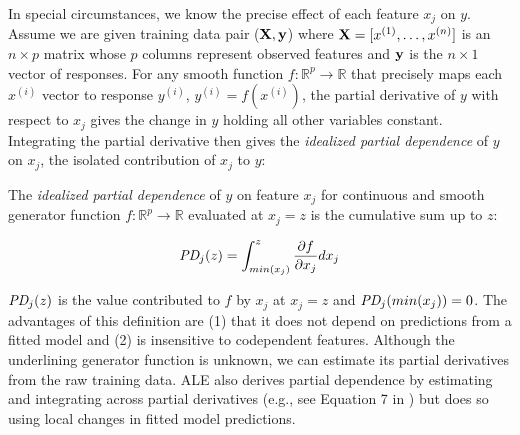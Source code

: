 \documentclass[]{article} %
\renewcommand{\xi}{x^{(i)}}
\begin{document}
In special circumstances, we know the precise effect of each feature $x_j$ on $y$.  Assume we are given training data pair ($\bf X, y$) where ${\bf X} = [x^{(1)}, \ldots, x^{(n)}]$ is an $n \times p$ matrix whose $p$ columns represent observed features and ${\bf y}$ is the $n \times 1$ vector of responses. For any smooth function $f:\mathbb{R}^{p} \rightarrow \mathbb{R}$ that precisely maps each $\xi$ vector to response $y^{(i)}$, ${y^{(i)}} = f(\xi)$, the partial derivative of $y$ with respect to $x_j$ gives the change in $y$ holding all other variables constant.  Integrating the partial derivative then gives the {\em idealized partial dependence}  of $y$ on $x_j$, the isolated contribution of $x_j$ to $y$:

 The {\em idealized partial dependence} of $y$ on feature $x_j$ for continuous and smooth generator function $f:\mathbb{R}^{p} \rightarrow \mathbb{R}$ evaluated at $x_j = z$ is the cumulative sum up to $z$:\vspace{-1mm}

\begin{equation}\label{eq:pd}
\text{\it PD}_j(z) = \int_{min(x_j)}^z \frac{\partial f}{\partial x_j} dx_j
\end{equation}\vspace{-1mm}

$\text{\it PD}_j(z)$ is the value contributed to $f$ by $x_j$ at $x_j = z$ and $\text{\it PD}_j(min(x_j))=0$. The advantages of this definition are (1) that it does not depend on predictions from a fitted model and (2) is insensitive to codependent features.  Although the underlining generator function is unknown, we can estimate its partial derivatives from the raw training data. ALE also derives partial dependence by estimating and integrating across partial derivatives (e.g., see Equation 7 in \citep{ALE}) but does so using local changes in fitted model predictions.
\end{document}
